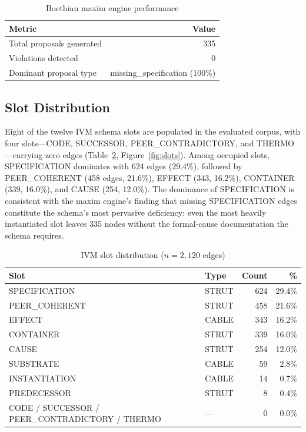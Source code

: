 \documentclass{iosart2x}
\begin{document}
\begin{table}[htb]
\caption{Boethian maxim engine performance}
\label{tab:maxims}
\centering
\begin{tabular}{lr}
\toprule
Metric & Value \\
\midrule
Total proposals generated & 335 \\
Violations detected       & 0   \\
Dominant proposal type    & missing\_specification (100\%) \\
\bottomrule
\end{tabular}
\end{table}

\subsection{Slot Distribution}

Eight of the twelve IVM schema slots are populated in the evaluated corpus, with four slots---CODE, SUCCESSOR, PEER\_CONTRADICTORY, and THERMO---carrying zero edges (Table~\ref{tab:slots}, Figure~\ref{fig:slots}). Among occupied slots, SPECIFICATION dominates with 624 edges (29.4\%), followed by PEER\_COHERENT (458 edges, 21.6\%), EFFECT (343, 16.2\%), CONTAINER (339, 16.0\%), and CAUSE (254, 12.0\%). The dominance of SPECIFICATION is consistent with the maxim engine's finding that missing SPECIFICATION edges constitute the schema's most pervasive deficiency: even the most heavily instantiated slot leaves 335 nodes without the formal-cause documentation the schema requires.

\begin{table}[htb]
\caption{IVM slot distribution ($n = 2{,}120$ edges)}
\label{tab:slots}
\centering
\begin{tabular}{llrr}
\toprule
Slot & Type & Count & \% \\
\midrule
SPECIFICATION   & STRUT & 624 & 29.4\% \\
PEER\_COHERENT  & STRUT & 458 & 21.6\% \\
EFFECT          & CABLE & 343 & 16.2\% \\
CONTAINER       & STRUT & 339 & 16.0\% \\
CAUSE           & STRUT & 254 & 12.0\% \\
SUBSTRATE       & CABLE &  59 &  2.8\% \\
INSTANTIATION   & CABLE &  14 &  0.7\% \\
PREDECESSOR     & STRUT &   8 &  0.4\% \\
CODE / SUCCESSOR / PEER\_CONTRADICTORY / THERMO & --- & 0 & 0.0\% \\
\bottomrule
\end{tabular}
\end{table}
\end{document}
